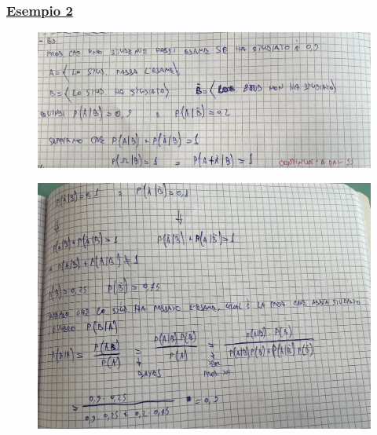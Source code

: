 \documentclass{article}
\begin{document}
\subsubsection{\underline{Esempio 2}}
\begin{figure}[ht]
\centering
\includegraphics[scale=0.12]{ese/10.jpeg}
\end{figure}
\begin{figure}[ht]
\centering
\includegraphics[scale=0.12]{ese/10a.jpeg}
\end{figure}
\newpage
\end{document}
